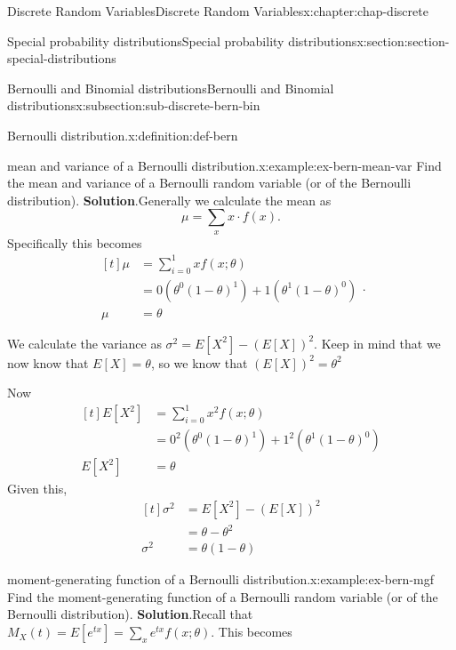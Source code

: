 \documentclass[oneside,10pt,]{book}
\newcommand{\blocktitlefont}{\relax}
\newcommand{\amp}{&}
\begin{document}
\begin{chapterptx}{Discrete Random Variables}{}{Discrete Random Variables}{}{}{x:chapter:chap-discrete}
\begin{sectionptx}{Special probability distributions}{}{Special probability distributions}{}{}{x:section:section-special-distributions}
\begin{subsectionptx}{Bernoulli and Binomial distributions}{}{Bernoulli and Binomial distributions}{}{}{x:subsection:sub-discrete-bern-bin}
\begin{definition}{Bernoulli distribution.}{x:definition:def-bern}
%
\end{definition}
\begin{example}{mean and variance of a Bernoulli distribution.}{x:example:ex-bern-mean-var}%
Find the mean and variance of a Bernoulli random variable (or of the Bernoulli distribution).%
\textbf{\blocktitlefont Solution}.\quad{}Generally we calculate the mean as%
\begin{equation*}
\mu = \sum_x x\cdot f(x)\text{.}
\end{equation*}
Specifically this becomes%
\begin{equation*}
\begin{aligned}[t]
\mu \amp = \sum_{i=0}^1 x f(x; \theta)\\
\amp = 0\left(\theta^0(1-\theta)^1\right) +
1\left(\theta^1(1-\theta)^0\right)\\
\mu \amp = \theta
\end{aligned}\text{.}
\end{equation*}
%
\par
We calculate the variance as \(\sigma^2 =
E[X^2]-\left(E[X]\right)^2\). Keep in mind that we now know that \(E[X] = \theta\), so we know that \(\left(E[X]\right)^2 =
\theta^2\)%
\par
Now%
\begin{equation*}
\begin{aligned}[t]
E[X^2] \amp = \sum_{i=0}^1 x^2 f(x; \theta)\\
\amp = 0^2\left(\theta^0(1-\theta)^1\right) +
1^2\left(\theta^1(1-\theta)^0\right)\\
E[X^2] \amp = \theta
\end{aligned}
\end{equation*}
Given this,%
\begin{equation*}
\begin{aligned}[t]
\sigma^2 \amp = E[X^2]-\left(E[X]\right)^2\\
\amp = \theta - \theta^2 \\
\sigma^2 \amp = \theta(1-\theta)
\end{aligned}
\end{equation*}
%
\end{example}
\begin{example}{moment-generating function of a Bernoulli distribution.}{x:example:ex-bern-mgf}%
Find the moment-generating function of a Bernoulli random variable (or of the Bernoulli distribution).%
\textbf{\blocktitlefont Solution}.\quad{}Recall that \(\displaystyle M_X(t) = E[e^{tx}] = \sum_x e^{tx} f(x;
\theta)\). This becomes%
\begin{equation*}

\end{equation*}
\end{example}
\end{subsectionptx}
\end{sectionptx}
\end{chapterptx}
\end{document}

